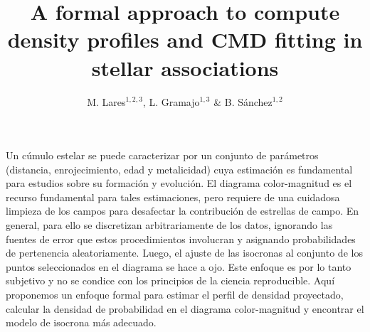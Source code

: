 \documentclass[11pt,twoside
]{article}
\begin{document}
\myselectspanish
\vskip 1.0cm
%
{}

\pagestyle{myheadings}

\title{A formal approach to compute density profiles and CMD fitting in
stellar associations}

\author{M. Lares$^{1,2,3}$, L. Gramajo$^{1,3}$ \& B. S\'anchez$^{1,2}$}


\begin{resumen}
Un c\'umulo estelar se puede caracterizar por un conjunto de par\'ametros
(distancia, enrojecimiento, edad y metalicidad) cuya estimaci\'on es
fundamental para estudios sobre su formaci\'on y evoluci\'on.
%
El diagrama color-magnitud es el recurso fundamental para tales
estimaciones, pero requiere de una cuidadosa limpieza de los campos
para desafectar la contribuci\'on de estrellas de campo.
%
En general, para ello se discretizan arbitrariamente de los datos,
ignorando las fuentes de error que estos procedimientos involucran y
asignando probabilidades de pertenencia aleatoriamente.
%
Luego, el ajuste de las isocronas al conjunto de los
puntos seleccionados en el diagrama se hace a ojo.  Este enfoque es
por lo tanto subjetivo y no se condice con los principios de la
ciencia reproducible.
%
Aqu\'i proponemos un enfoque formal para estimar el
perfil de densidad proyectado, calcular la densidad de probabilidad
en el diagrama color-magnitud y encontrar el modelo de
isocrona m\'as adecuado.
\end{resumen}
\end{document}

